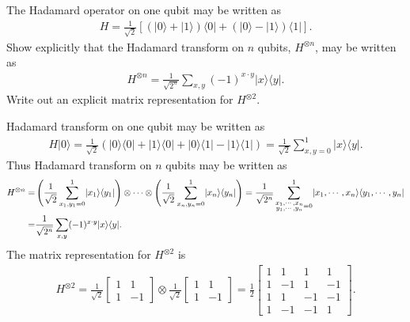 \documentclass[en]{sol-man}
\begin{document}
\begin{exe}
    The Hadamard operator on one qubit may be written as
    \begin{align}
        H=\frac{1}{\sqrt{2}}\left[(\lvert 0\rangle+\lvert 1\rangle)\langle 0\rvert+(\lvert 0\rangle-\lvert 1\rangle)\langle 1\rvert\right].
    \end{align}
    Show explicitly that the Hadamard transform on $n$ qubits, $H^{\otimes n}$, may be written as
    \begin{align}
        H^{\otimes n}=\frac{1}{\sqrt{2^n}}\sum_{x,y}(-1)^{x\cdot y}\lvert x\rangle\langle y\rvert.
    \end{align}
    Write out an explicit matrix representation for $H^{\otimes 2}$.
\end{exe}
\begin{sol}
    Hadamard transform on one qubit may be written as
    \begin{align}
        H\lvert 0\rangle=\frac{1}{\sqrt{2}}(\lvert 0\rangle\langle 0\rvert+\lvert 1\rangle\langle 0\rvert+\lvert 0\rangle\langle 1\rvert-\lvert 1\rangle\langle 1\rvert)=\frac{1}{\sqrt{2}}\sum_{x,y=0}^1\lvert x\rangle\langle y\rvert.
    \end{align}
    Thus Hadamard transform on $n$ qubits may be written as
    \begin{align}
        \notag H^{\otimes n}=&\left(\frac{1}{\sqrt{2}}\sum_{x_1,y_1=0}^1\lvert x_1\rangle\langle y_1\rvert\right)\otimes\cdots\otimes\left(\frac{1}{\sqrt{2}}\sum_{x_n,y_n=0}^1\lvert x_n\rangle\langle y_n\rvert\right)=\frac{1}{\sqrt{2^n}}\sum_{\substack{x_1,\cdots,x_n\\y_1,\cdots,y_n}=0}^1\lvert x_1,\cdots,x_n\rangle\langle y_1,\cdots,y_n\rvert\\
        =&\frac{1}{\sqrt{2^n}}\sum_{x,y}(-1)^{x\cdot y}\lvert x\rangle\langle y\rvert.
    \end{align}
    The matrix representation for $H^{\otimes 2}$ is
    \begin{align}
        H^{\otimes 2}=\frac{1}{\sqrt{2}}\left[\begin{matrix}
            1&1\\
            1&-1
        \end{matrix}\right]\otimes\frac{1}{\sqrt{2}}\left[\begin{matrix}
            1&1\\
            1&-1
        \end{matrix}\right]=\frac{1}{2}\left[\begin{matrix}
            1&1&1&1\\
            1&-1&1&-1\\
            1&1&-1&-1\\
            1&-1&-1&1
        \end{matrix}\right].
    \end{align}
\end{sol}
\end{document}
